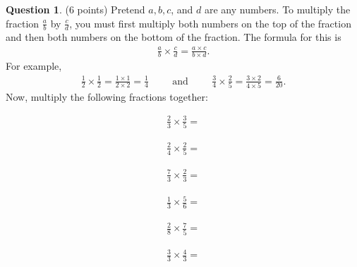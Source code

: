 \documentclass[12pt]{article}
\theoremstyle{definition}
\newtheorem{question}[thm]{Question}
\begin{document}
\begin{question}
	(6 points) Pretend $a,b,c$, and $d$ are any numbers. To multiply the fraction $\frac{a}{b}$ by $\frac{c}{d}$, you must first multiply both numbers on the top of the fraction and then both numbers on the bottom of the fraction. The formula for this is
	\begin{align}
	\frac{a}{b} \times \frac{c}{d} = \frac{a \times c}{b \times d}.
	\end{align}
	For example,
	\begin{align}
	\frac{1}{2} \times \frac{1}{2} = \frac{1 \times 1}{2 \times 2} = \frac{1}{4} \hspace{1cm}\textrm{and}\hspace{1cm}\frac{3}{4}\times \frac{2}{5} = \frac{3 \times 2}{4 \times 5} = \frac{6}{20}.
	\end{align}
	Now, multiply the following fractions together:
	\begin{multicols}{3}
		\item \begin{align*}
		\frac{2}{3} \times \frac{3}{5}=
		\end{align*}
		\item \begin{align*}
		\frac{2}{4} \times \frac{2}{5}=
		\end{align*}
		\item \begin{align*}
		\frac{7}{3} \times \frac{2}{3}=
		\end{align*}
		\item \begin{align*}
		\frac{1}{3} \times \frac{5}{6}=
		\end{align*}
		\item \begin{align*}
		\frac{2}{8} \times \frac{7}{5}=
		\end{align*}
		\item \begin{align*}
		\frac{3}{3} \times \frac{4}{3}=
		\end{align*}
	\end{multicols}
\end{question}
\end{document}
